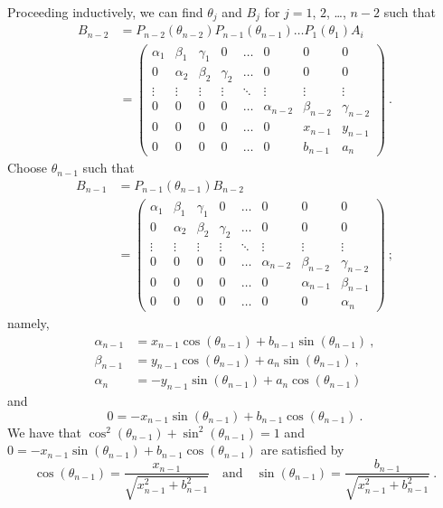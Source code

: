 Proceeding inductively, we can find $\theta_j$ and
$B_j$ for $j=1$, $2$, \ldots, $n-2$ such that
\begin{align*}
B_{n-2} &= P_{n-2}(\theta_{n-2}) P_{n-1}(\theta_{n-1}) \ldots P_1(\theta_1) A_i \\
&=
\begin{pmatrix}
\alpha_1 & \beta_1 & \gamma_1 & 0 & \ldots & 0 & 0 & 0 \\
0 & \alpha_2 & \beta_2 & \gamma_2 & \ldots & 0 & 0 & 0 \\
\vdots & \vdots & \vdots & \vdots & \ddots & \vdots & \vdots & \vdots \\
0 & 0 & 0 & 0 & \ldots & \alpha_{n-2} & \beta_{n-2} & \gamma_{n-2} \\ 
0 & 0 & 0 & 0 & \ldots & 0 & x_{n-1} & y_{n-1} \\
0 & 0 & 0 & 0 & \ldots & 0 & b_{n-1} & a_{n} 
\end{pmatrix} \ .
\end{align*}
Choose $\theta_{n-1}$ such that
\begin{align*}
B_{n-1} &= P_{n-1}(\theta_{n-1}) B_{n-2} \\
&=
\begin{pmatrix}
\alpha_1 & \beta_1 & \gamma_1 & 0 & \ldots & 0 & 0 & 0 \\
0 & \alpha_2 & \beta_2 & \gamma_2 & \ldots & 0 & 0 & 0 \\
\vdots & \vdots & \vdots & \vdots & \ddots & \vdots & \vdots & \vdots \\
0 & 0 & 0 & 0 & \ldots & \alpha_{n-2} & \beta_{n-2} & \gamma_{n-2} \\ 
0 & 0 & 0 & 0 & \ldots & 0 & \alpha_{n-1} & \beta_{n-1} \\
0 & 0 & 0 & 0 & \ldots & 0 & 0 & \alpha_n 
\end{pmatrix} \ ;
\end{align*}
namely,
\begin{equation}\label{C14L38}
\begin{split}
\alpha_{n-1} &= x_{n-1} \cos(\theta_{n-1}) + b_{n-1} \sin(\theta_{n-1}) \ , \\
\beta_{n-1} &= y_{n-1} \cos(\theta_{n-1}) + a_n \sin(\theta_{n-1}) \ , \\
\alpha_n &= - y_{n-1} \sin(\theta_{n-1}) + a_n \cos(\theta_{n-1})
\end{split}
\end{equation}
and
\[
0 = -x_{n-1} \sin(\theta_{n-1}) + b_{n-1} \cos(\theta_{n-1}) \ .
\]
We have that $\cos^2(\theta_{n-1})+\sin^2(\theta_{n-1}) = 1$ and
$0 = -x_{n-1} \sin(\theta_{n-1}) + b_{n-1} \cos(\theta_{n-1})$ are
satisfied by
\begin{equation} \label{C14L39}
\cos(\theta_{n-1}) = \frac{x_{n-1}}{\sqrt{x_{n-1}^2 + b_{n-1}^2}} \quad
\text{and} \quad
\sin(\theta_{n-1}) = \frac{b_{n-1}}{\sqrt{x_{n-1}^2 + b_{n-1}^2}} \ .
\end{equation}

